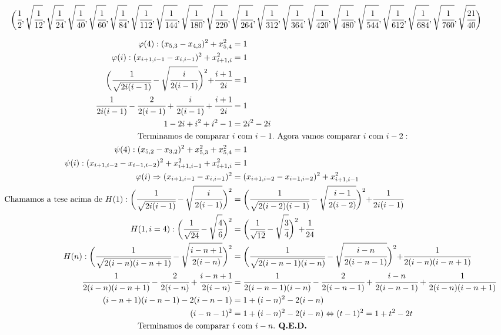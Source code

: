 \documentclass[8pt,a4paper]{article}
\begin{document}
\begin{align*}
			\biggl(&\cfrac{1}{2} , \sqrt{\cfrac{1}{12}} , \sqrt{\cfrac{1}{24}} , \sqrt{\cfrac{1}{40}} , \sqrt{\cfrac{1}{60}} , \sqrt{\cfrac{1}{84}} , \sqrt{\cfrac{1}{112}} , \sqrt{\cfrac{1}{144}} , \sqrt{\cfrac{1}{180}} , \sqrt{\cfrac{1}{220}} , \sqrt{\cfrac{1}{264}} , \sqrt{\cfrac{1}{312}} , \sqrt{\cfrac{1}{364}} , \sqrt{\cfrac{1}{420}} , \sqrt{\cfrac{1}{480}} , \sqrt{\cfrac{1}{544}} , \sqrt{\cfrac{1}{612}} , \sqrt{\cfrac{1}{684}} , \sqrt{\cfrac{1}{760}} , \sqrt{\cfrac{21}{40}}\biggl)
		\end{align*}

	\footnotesize

		\begin{align*}
			\varphi(4) : (x_{5,3} -  x_{4,3})^2 + x_{5,4}^2 &= 1 \\
			\varphi(i) : (x_{i+1,i-1} -  x_{i,i-1})^2 + x_{i+1,i}^2 &= 1 \\
			\biggl( \cfrac{1}{\sqrt{2i(i-1)}} - \sqrt{\cfrac{i}{2(i-1)}} \biggl)^2 + \cfrac{i + 1}{2i} &= 1 \\
			\cfrac{1}{2i(i-1)} - \cfrac{2}{2(i-1)} + \cfrac{i}{2(i-1)} + \cfrac{i + 1}{2i} &= 1 \\
			1 - 2i + i^2 + i^2 - 1 &= 2i^2 - 2i \\
			\text{Terminamos de comparar }&i\text{ com }i - 1.\text{ Agora vamos comparar }i\text{ com }i - 2: \\
			\psi(4) : (x_{5,2} -  x_{3,2})^2 + x_{5,3}^2 + x_{5,4}^2 &= 1 \\
			\psi(i) : (x_{i+1,i-2} -  x_{i-1,i-2})^2 + x_{i+1,i-1}^2 + x_{i+1,i}^2 &= 1 \\
			\varphi(i) \Rightarrow (x_{i+1,i-1} -  x_{i,i-1})^2 &= (x_{i+1,i-2} -  x_{i-1,i-2})^2  + x_{i+1,i-1}^2 \\
			\text{Chamamos a tese acima de }H(1) : \biggl( \cfrac{1}{\sqrt{2i(i-1)}} - \sqrt{\cfrac{i}{2(i-1)}} \biggl)^2 &= \biggl( \cfrac{1}{\sqrt{2(i-2)(i-1)}} - \sqrt{\cfrac{i-1}{2(i-2)}} \biggl)^2 + \cfrac{1}{2i(i-1)} \\
			H(1, i = 4) : \biggl( \cfrac{1}{\sqrt{24}} - \sqrt{\cfrac{4}{6}} \biggl)^2 &= \biggl( \cfrac{1}{\sqrt{12}} - \sqrt{\cfrac{3}{4}} \biggl)^2 + \cfrac{1}{24} \\
			H(n) : \biggl( \cfrac{1}{\sqrt{2(i-n)(i-n+1)}} - \sqrt{\cfrac{i-n+1}{2(i-n)}} \biggl)^2 &= \biggl( \cfrac{1}{\sqrt{2(i-n-1)(i-n)}} - \sqrt{\cfrac{i-n}{2(i-n-1)}} \biggl)^2 + \cfrac{1}{2(i-n)(i-n+1)} \\
			\cfrac{1}{2(i-n)(i-n+1)} - \cfrac{2}{2(i-n)} + \cfrac{i-n+1}{2(i-n)} &= \cfrac{1}{2(i-n-1)(i-n)} - \cfrac{2}{2(i-n-1)} + \cfrac{i-n}{2(i-n-1)} + \cfrac{1}{2(i-n)(i-n+1)} \\
			(i-n+1)(i-n-1) - 2(i - n - 1) &= 1 + (i-n)^2 -2(i-n) \\
			(i-n -1)^2 &= 1 + (i-n)^2 -2(i-n) \Leftrightarrow (t-1)^2 = 1 + t^2 - 2t \\
			\text{Terminamos de comparar }&i\text{ com }i - n.\textbf{ Q.E.D.}
		\end{align*}
\end{document}

